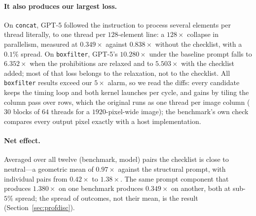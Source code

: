 \paragraph{It also produces our largest loss.}
On \texttt{concat}, GPT-5 followed the instruction to process several elements per thread literally,
to one thread per $128$-element line: a $128\times$ collapse in parallelism, measured at $0.349\times$
against $0.838\times$ without the checklist, with a $0.1\%$ spread. On \texttt{boxfilter}, GPT-5's
$10.280\times$ under the baseline prompt falls to $6.352\times$ when the prohibitions are relaxed and
to $5.503\times$ with the checklist added; most of that loss belongs to the relaxation, not to the
checklist. All \texttt{boxfilter} results exceed our $5\times$ alarm, so we read the diffs: every
candidate keeps the timing loop and both kernel launches per cycle, and gains by tiling the column
pass over rows, which the original runs as one thread per image column ($30$ blocks of $64$ threads
for a $1920$-pixel-wide image); the benchmark's own check compares every output pixel exactly with a
host implementation.

\paragraph{Net effect.}
Averaged over all twelve (benchmark, model) pairs the checklist is close to neutral---a geometric mean
of $0.97\times$ against the structural prompt, with individual pairs from $0.42\times$ to
$1.38\times$. The same prompt component that produces $1.380\times$ on one benchmark produces
$0.349\times$ on another, both at sub-$5\%$ spread; the spread of outcomes, not their mean, is the
result (Section~\ref{sec:profdisc}).

